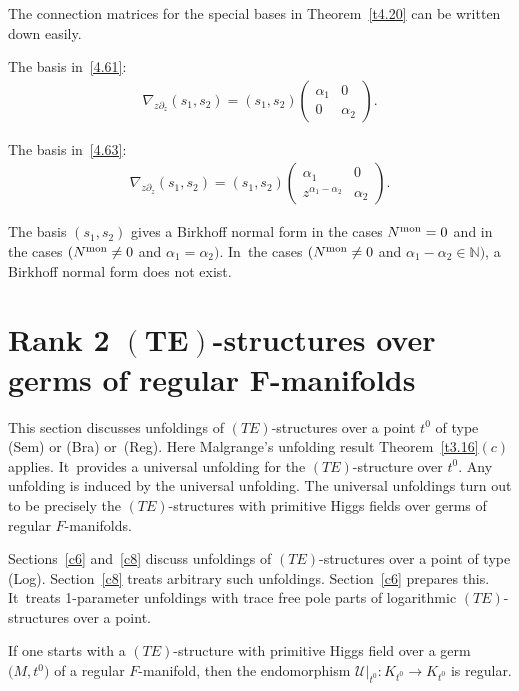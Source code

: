 \documentclass[pdftex]{sigma}%
\numberwithin{equation}{section}
\numberwithin{figure}{section}
\newcommand{\N}{{\mathbb N}}
\newcommand{\UU}{{\mathcal U}}
\newcommand{\paa}{\partial}
\newcommand{\nnn}{\nabla}
\begin{document}
\begin{Remark}\label{t4.22}
The connection matrices for the special bases in
Theorem~\ref{t4.20} can be written down easily.

The basis in~\eqref{4.61}:
\begin{gather*}%
\nnn_{z\paa_z}(s_1,s_2)=(s_1,s_2)
\begin{pmatrix}\alpha_1 & 0 \\ 0 & \alpha_2\end{pmatrix}\!.
\end{gather*}

The basis in~\eqref{4.63}:
\begin{gather*}%
\nnn_{z\paa_z}(s_1,s_2)=(s_1,s_2)
\begin{pmatrix}\alpha_1 & 0 \\ z^{\alpha_1-\alpha_2} & \alpha_2\end{pmatrix}\!.
\end{gather*}

The basis $(s_1,s_2)$ gives a Birkhoff normal form
in the cases $N^{\rm mon}=0$ and in the cases
$(N^{\rm mon}\neq 0$ and $\alpha_1=\alpha_2)$. In~the cases $(N^{\rm mon}\neq 0$ and $\alpha_1-\alpha_2\in\N)$,
a Birkhoff normal form does not exist.
\end{Remark}

\section[Rank 2 $(TE)$-structures over germs of regular $F$-manifolds]{Rank 2 $\boldsymbol{(TE)}$-structures over germs of regular $\boldsymbol{F}$-manifolds}\label{c5}

This section discusses unfoldings of
$(TE)$-structures over a point $t^0$
of type (Sem) or (Bra) or~(Reg).
Here Malgrange's unfolding result
Theorem~\ref{t3.16}$(c)$ applies. It~provides a universal unfolding for the $(TE)$-structure
over $t^0$. Any unfolding is induced by the universal
unfolding.
The universal unfoldings turn out to be precisely
the $(TE)$-structures with primitive Higgs fields
over germs of regular $F$-manifolds.

Sections~\ref{c6} and~\ref{c8} discuss
unfoldings of $(TE)$-structures over a point of type (Log).
Section~\ref{c8} treats arbitrary such unfoldings.
Section~\ref{c6} prepares this. It~treats 1-parameter unfoldings with trace free pole parts
of logarithmic $(TE)$-structures over a point.

If one starts with a $(TE)$-structure with primitive Higgs field
over a germ $\big(M,t^0\big)$ of a regular $F$-manifold, then
the endomorphism $\UU|_{t^0}\colon K_{t^0}\to K_{t^0}$ is regular.
\end{document}
